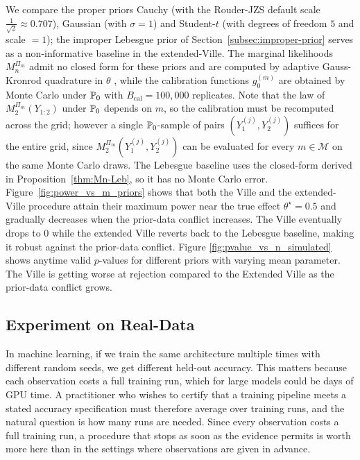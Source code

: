 We compare the proper priors Cauchy (with the Rouder-JZS default scale $\frac{1}{\sqrt{2}} \approx 0.707$), Gaussian (with $\sigma = 1$) and Student-\(t\) (with degrees of freedom $5$ and scale $=1$); the improper Lebesgue prior of Section~\ref{subsec:improper-prior} serves as a non-informative baseline in the extended-Ville. The marginal likelihoods \(M_n^{\Pi_m}\) admit no closed form for these priors and are computed by adaptive Gauss-Kronrod quadrature in \(\theta\) \citep{piessens2012quadpack}, while the calibration functions
\(g_0^{(m)}\) are obtained by Monte Carlo under \(\mathbb{P}_0\) with
\(B_{\mathrm{cal}}=100{,}000\) replicates. Note that the law of \(M_2^{\Pi_m}(Y_{1:2})\) under \(\mathbb{P}_0\) depends on \(m\), so the calibration must be recomputed across the grid; however a single \(\mathbb{P}_0\)-sample of pairs \((Y_1^{(j)},Y_2^{(j)})\) suffices for the entire grid, since \(M_2^{\Pi_m}(Y_1^{(j)},Y_2^{(j)})\) can be evaluated for every \(m\in\mathcal M\) on the same Monte Carlo draws. The Lebesgue baseline uses the closed-form derived in Proposition~\ref{thm:Mn-Leb}, so it has no Monte Carlo error. Figure~\ref{fig:power_vs_m_priors} shows that both the Ville and the extended-Ville procedure attain their maximum power near the true effect \(\theta^\star=0.5\) and gradually decreases when the prior-data conflict increases. The Ville eventually drops to $0$ while the extended Ville reverts back to the Lebesgue baseline, making it robust against the prior-data conflict. Figure \ref{fig:pvalue_vs_n_simulated} shows anytime valid $p$-values for different priors with varying mean parameter. The Ville is getting worse at rejection compared to the Extended Ville as the prior-data conflict grows.



\subsection{Experiment on Real-Data}
In machine learning, if we train the same architecture multiple times with different random seeds, we get different held-out accuracy. This matters because each observation costs a full training run, which for large models could be days of GPU time. A practitioner who wishes to certify that a training pipeline meets a stated accuracy specification must therefore average over training runs, and the
natural question is how many runs are needed. Since every observation costs a full training run, a procedure that stops as soon as the evidence permits is worth more here than in the settings where observations are given in advance.

